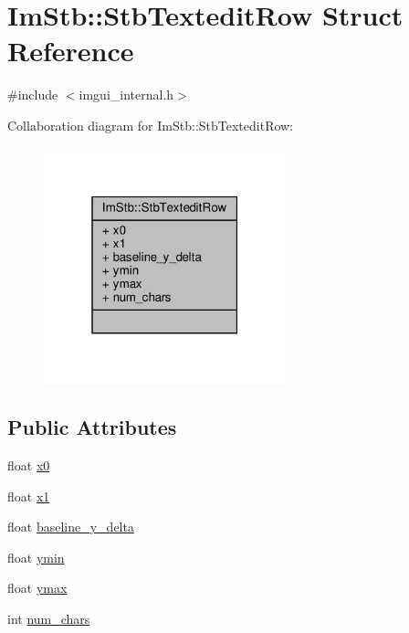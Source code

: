 \hypertarget{structImStb_1_1StbTexteditRow}{}\section{Im\+Stb\+:\+:Stb\+Textedit\+Row Struct Reference}
\label{structImStb_1_1StbTexteditRow}


{\ttfamily \#include $<$imgui\+\_\+internal.\+h$>$}



Collaboration diagram for Im\+Stb\+:\+:Stb\+Textedit\+Row\+:
\nopagebreak
\begin{figure}[H]
\begin{center}
\leavevmode
\includegraphics[width=199pt]{structImStb_1_1StbTexteditRow__coll__graph}
\end{center}
\end{figure}
\subsection*{Public Attributes}
\begin{DoxyCompactItemize}
\item 
float \hyperlink{structImStb_1_1StbTexteditRow_a2059076dfcc9bd26e63796e870265a6b}{x0}
\item 
float \hyperlink{structImStb_1_1StbTexteditRow_a832458012a87652a9473d1933c9e06e9}{x1}
\item 
float \hyperlink{structImStb_1_1StbTexteditRow_a135082081ed3982fdf5ca648b9111eb4}{baseline\+\_\+y\+\_\+delta}
\item 
float \hyperlink{structImStb_1_1StbTexteditRow_a2b4c4926f3b556b5edb0010abd07a7c1}{ymin}
\item 
float \hyperlink{structImStb_1_1StbTexteditRow_a339f55d2fc566ca049596ee3286bbc87}{ymax}
\item 
int \hyperlink{structImStb_1_1StbTexteditRow_ac0ee658019010e456da1116a6ea7c2ba}{num\+\_\+chars}
\end{DoxyCompactItemize}


